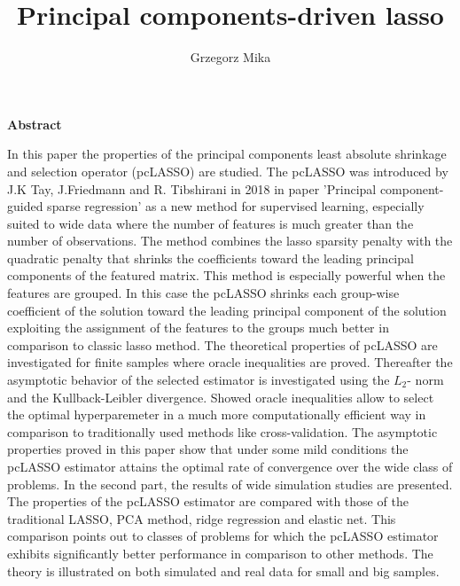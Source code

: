 \documentclass[12pt]{article}
\title{Principal components-driven lasso}
\author{Grzegorz Mika}
\date{}
\begin{document}
\maketitle
\begin{center}
\textbf{Abstract}
\end{center}

In this paper the properties of the principal components least absolute shrinkage and selection operator (pcLASSO) are studied. The pcLASSO was introduced by J.K Tay, J.Friedmann and R. Tibshirani in 2018 in paper 'Principal component-guided sparse regression' as a new method for supervised learning, especially suited to wide data where the number of features is much greater than the number of observations. The method combines the lasso sparsity penalty with the quadratic penalty that shrinks the coefficients toward the leading principal components of the featured matrix. This method is especially powerful when the features are grouped. In this case the pcLASSO shrinks each group-wise coefficient of the solution toward the leading principal component of the solution exploiting the assignment of the features to the groups much better in comparison to classic lasso method. The theoretical properties of pcLASSO are investigated for finite samples where oracle inequalities are proved. Thereafter the  asymptotic behavior of the selected estimator is investigated using the $L_2$- norm and the Kullback-Leibler divergence. Showed oracle inequalities allow to select the optimal hyperparemeter in a much more computationally efficient way in comparison to traditionally used methods like cross-validation. The asymptotic properties proved in this paper show that under some mild conditions the pcLASSO estimator attains the optimal rate of convergence over the wide class of problems. In the second part, the results of wide simulation studies are presented. The properties of the pcLASSO estimator are compared with those of the traditional LASSO, PCA method, ridge regression and elastic net. This comparison points out to classes of problems for which the pcLASSO estimator exhibits significantly better performance in comparison to other methods. The theory is illustrated on both simulated and real data for small and big samples.
\end{document}
